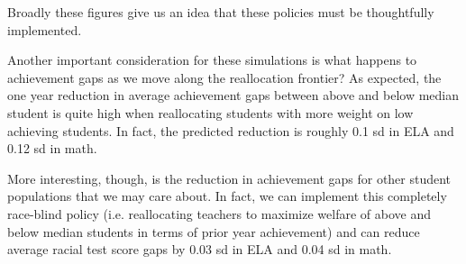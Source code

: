\documentclass[12pt]{article}
\theoremstyle{definition}
\theoremstyle{definition}
\theoremstyle{definition}
\theoremstyle{definition}
\begin{document}
Broadly these figures give us an idea that these policies must be thoughtfully implemented. 


Another important consideration for these simulations is what happens to achievement gaps as we move along the reallocation frontier? As expected, the one year reduction in average achievement gaps between above and below median student is quite high when reallocating students with more weight on low achieving students. In fact, the predicted reduction is roughly 0.1 sd in ELA and 0.12 sd in math.

	More interesting, though, is the reduction in achievement gaps for other student populations that we may care about. In fact, we can implement this completely race-blind policy (i.e. reallocating teachers to maximize welfare of above and below median students in terms of prior year achievement) and can reduce average racial test score gaps by 0.03 sd in ELA and 0.04 sd in math. 
 
\end{document}
